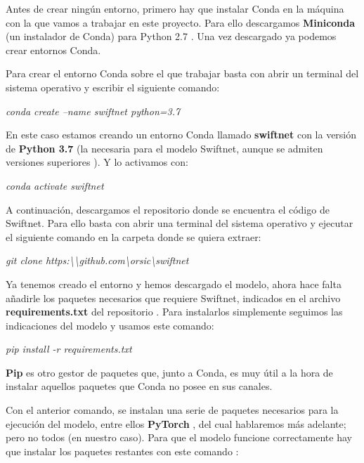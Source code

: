 Antes de crear ningún entorno, primero hay que instalar Conda en la máquina con la que vamos a trabajar en este proyecto. Para ello descargamos \textbf{Miniconda} (un instalador de Conda) para Python 2.7 \cite{miniconda_install}. Una vez descargado ya podemos crear entornos Conda.


Para crear el entorno Conda sobre el que trabajar basta con abrir un terminal del sistema operativo y escribir el siguiente comando:

\begin{center}
\textit{conda create --name swiftnet python=3.7}
\end{center}

En este caso estamos creando un entorno Conda llamado \textbf{swiftnet} con la versión de \textbf{Python 3.7} (la necesaria para el modelo Swiftnet, aunque se admiten versiones superiores  \cite{github_swiftnet}). Y lo activamos con:

\begin{center}
\textit{conda activate swiftnet}
\end{center}

A continuación, descargamos el repositorio donde se encuentra el código de Swiftnet. Para ello basta con abrir una terminal del sistema operativo y ejecutar el siguiente comando en la carpeta donde se quiera extraer:

\begin{center}
\textit{git clone https:\textbackslash{}\textbackslash{github.com}\textbackslash{orsic}\textbackslash{swiftnet}}
\end{center}

Ya tenemos creado el entorno y hemos descargado el modelo, ahora hace falta añadirle los paquetes necesarios que requiere Swiftnet, indicados en el archivo \textbf{requirements.txt} del repositorio \cite{github_swiftnet}. Para instalarlos simplemente seguimos las indicaciones del modelo y usamos este comando:

\begin{center}
\textit{pip install -r requirements.txt}
\end{center}

\textbf{Pip} \cite{pip} es otro gestor de paquetes que, junto a Conda, es muy útil a la hora de instalar aquellos paquetes que Conda no posee en sus canales.

Con el anterior comando, se instalan una serie de paquetes necesarios para la ejecución del modelo, entre ellos \textbf{PyTorch} \cite{pytorch}, del cual hablaremos más adelante; pero no todos (en nuestro caso). Para que el modelo funcione correctamente hay que instalar los paquetes restantes con este comando \cite{conda_sheet}:

